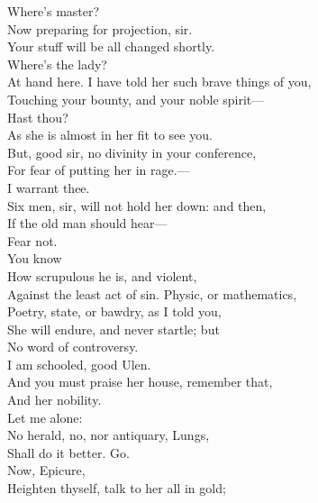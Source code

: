 \documentclass[a4paper,oneside,12pt]{memoir}
\begin{document}
\begin{drama*}
\mammonspeaks Where's master?\\
\facespeaks {} Now preparing for projection, sir.\\
Your stuff will be all changed shortly.\\
\mammonspeaks {} Where's the lady?\\
\facespeaks At hand here. I have told her such brave things of you,\\
Touching your bounty, and your noble spirit---\\
\mammonspeaks Hast thou?\\
\facespeaks {} As she is almost in her fit to see you.\\
But, good sir, no divinity in your conference,\\
For fear of putting her in rage.---\\
\mammonspeaks {} I warrant thee.\\
\facespeaks Six men, sir, will not hold her down: and then,\\
If the old man should hear---\\
\mammonspeaks {} Fear not.\\
\facespeaks {} You know\\
How scrupulous he is, and violent,\\
Against the least act of sin. Physic, or mathematics,\\
Poetry, state, or bawdry, as I told you,\\
She will endure, and never startle; but\\
No word of controversy.\\
\mammonspeaks {} I am schooled, good Ulen.\\
\facespeaks And you must praise her house, remember that,\\
And her nobility.\\
\mammonspeaks {} Let me alone:\\
No herald, no, nor antiquary, Lungs,\\
Shall do it better. Go.\\
\mammonspeaks {} Now, Epicure,\\
Heighten thyself, talk to her all in gold;\\

\end{drama*}
\end{document}
